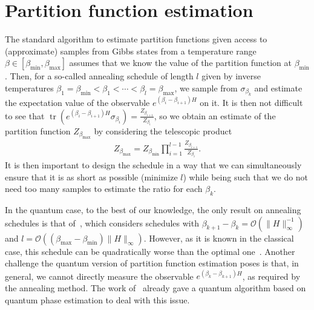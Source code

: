 \documentclass[aps,pra,amsmath,amssymb,twocolumn,10pt]{revtex4-2}
\theoremstyle{definition}
\def\lb{\left(}
\def\rb{\right)}
\newcommand{\tr}[1]{\operatorname{tr}\lb#1\rb}
\begin{document}

\section{Partition function estimation}\label{sec:partition_function}

The standard algorithm to estimate partition functions given access to (approximate) samples from Gibbs states from a temperature range $\beta\in[\beta_{\min},\beta_{\max}]$ assumes that we know the value of the partition function at $\beta_{\min}$. Then, for a so-called annealing schedule of length $l$ given by inverse temperatures $\beta_1=\beta_{\min}<\beta_1<\cdots<\beta_l=\beta_{\max}$, we sample from $\sigma_{\beta_k}$ and estimate the expectation value of the observable $e^{(\beta_{i}-\beta_{i+1})H}$ on it. It is then not difficult to see that $\tr{e^{(\beta_{i}-\beta_{i+1})H}\sigma_{\beta_i}}=\tfrac{Z_{\beta_{i+1}}}{Z_{\beta_i}}$, so we obtain an estimate of the partition function $Z_{\beta_{\max}}$ by considering the telescopic product
\begin{align}
	Z_{\beta_{\max}}=Z_{\beta_{\min}}\prod\limits_{i=1}^{l-1}\tfrac{Z_{\beta_{i+1}}}{Z_{\beta_i}}.
\end{align}
It is then important to design the schedule in a way that we can simultaneously ensure that it is as short as possible (minimize $l$) while being such that we do not need too many samples to estimate the ratio for each $\beta_k$.


In the quantum case, to the best of our knowledge, the only result on annealing schedules is that of~\cite{poulin_sampling_2009}, which considers schedules with $\beta_{k+1}-\beta_k=\mathcal{O}(\|H\|_\infty^{-1})$ and $l=\mathcal{O}((\beta_{\max}-\beta_{\min})\|H\|_\infty)$. However, as it is known in the classical case, this schedule can be quadratically worse than the optimal one~\cite{Stefankovic2007}. Another challenge the quantum version of partition function estimation poses is that, in general, we cannot directly measure the observable $e^{(\beta_{k}-\beta_{k+1})H}$, as required by the annealing method. The work of~\cite{poulin_sampling_2009} already gave a quantum algorithm based on quantum phase estimation to deal with this issue. 
\end{document}
